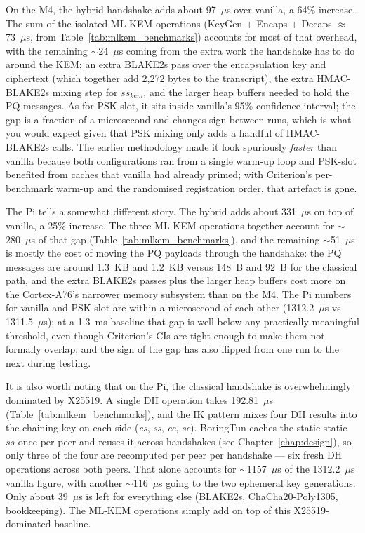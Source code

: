 On the M4, the hybrid handshake adds about 97~$\mu$s over vanilla, a 64\% increase. The sum of the isolated ML-KEM operations (KeyGen + Encaps + Decaps $\approx$ 73~$\mu$s, from Table~\ref{tab:mlkem_benchmarks}) accounts for most of that overhead, with the remaining $\sim$24~$\mu$s coming from the extra work the handshake has to do around the KEM: an extra BLAKE2s pass over the encapsulation key and ciphertext (which together add 2,272 bytes to the transcript), the extra HMAC-BLAKE2s mixing step for $\mathit{ss}_\mathit{kem}$, and the larger heap buffers needed to hold the PQ messages. As for PSK-slot, it sits inside vanilla's 95\% confidence interval; the gap is a fraction of a microsecond and changes sign between runs, which is what you would expect given that PSK mixing only adds a handful of HMAC-BLAKE2s calls. The earlier methodology made it look spuriously \emph{faster} than vanilla because both configurations ran from a single warm-up loop and PSK-slot benefited from caches that vanilla had already primed; with Criterion's per-benchmark warm-up and the randomised registration order, that artefact is gone.

The Pi tells a somewhat different story. The hybrid adds about 331~$\mu$s on top of vanilla, a 25\% increase. The three ML-KEM operations together account for $\sim$280~$\mu$s of that gap (Table~\ref{tab:mlkem_benchmarks}), and the remaining $\sim$51~$\mu$s is mostly the cost of moving the PQ payloads through the handshake: the PQ messages are around 1.3~KB and 1.2~KB versus 148~B and 92~B for the classical path, and the extra BLAKE2s passes plus the larger heap buffers cost more on the Cortex-A76's narrower memory subsystem than on the M4. The Pi numbers for vanilla and PSK-slot are within a microsecond of each other (1312.2~$\mu$s vs 1311.5~$\mu$s); at a 1.3~ms baseline that gap is well below any practically meaningful threshold, even though Criterion's CIs are tight enough to make them not formally overlap, and the sign of the gap has also flipped from one run to the next during testing.

It is also worth noting that on the Pi, the classical handshake is overwhelmingly dominated by X25519. A single DH operation takes 192.81~$\mu$s (Table~\ref{tab:mlkem_benchmarks}), and the IK pattern mixes four DH results into the chaining key on each side (\emph{es}, \emph{ss}, \emph{ee}, \emph{se}). BoringTun caches the static-static $\mathit{ss}$ once per peer and reuses it across handshakes (see Chapter~\ref{chap:design}), so only three of the four are recomputed per peer per handshake --- six fresh DH operations across both peers. That alone accounts for $\sim$1157~$\mu$s of the 1312.2~$\mu$s vanilla figure, with another $\sim$116~$\mu$s going to the two ephemeral key generations. Only about 39~$\mu$s is left for everything else (BLAKE2s, ChaCha20-Poly1305, bookkeeping). The ML-KEM operations simply add on top of this X25519-dominated baseline.

